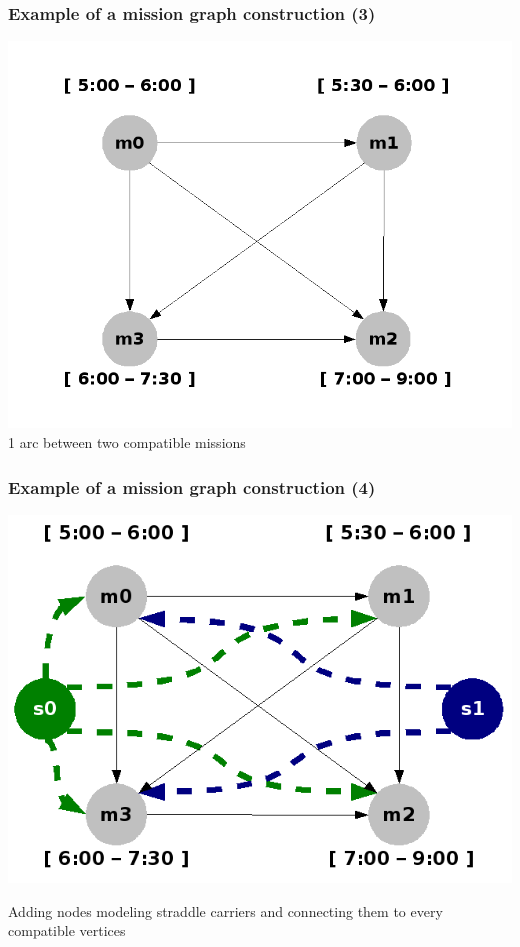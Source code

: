\documentclass{beamer}
\begin{document}
\begin{frame}
	\frametitle{Example of a mission graph construction (3)}
 	\begin{center}
 		\includegraphics[height=.50\textheight]{fig/precedence.png} \\

		1 arc between two compatible missions
	\end{center}
\end{frame}
\begin{frame}
	\frametitle{Example of a mission graph construction (4)}
 	\begin{center}
 		\includegraphics[height=.50\textheight]{fig/precedence_with_vehicles.png}
		
		Adding nodes modeling straddle carriers and connecting them to every compatible vertices
	\end{center}
\end{frame}
\end{document}
